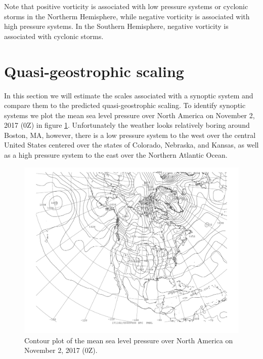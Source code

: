 \documentclass[11pt]{article}
\begin{document}
Note that positive vorticity is associated with low pressure systems or cyclonic storms in the Northerm Hemisphere, while negative vorticity is associated with high pressure systems. In the Southern Hemisphere, negative vorticity is associated with cyclonic storms.


\section{Quasi-geostrophic scaling}
In this section we will estimate the scales associated with a synoptic system and compare them to the predicted quasi-geostrophic scaling. To identify synoptic systems we plot the mean sea level pressure over North America on November 2, 2017 (0Z) in figure \ref{fig:pmsl_nam}. Unfortunately the weather looks relatively boring around Boston, MA, however, there is a low pressure system to the west over the central United States centered over the states of Colorado, Nebraska, and Kansas, as well as a high pressure system to the east over the Northern Atlantic Ocean.

\begin{figure}[h!]
	\centering
	\includegraphics[width=\textwidth]{pmsl_nam}
	\caption{Contour plot of the mean sea level pressure over North America on November 2, 2017 (0Z).}
	\label{fig:pmsl_nam}
\end{figure}
\end{document}
